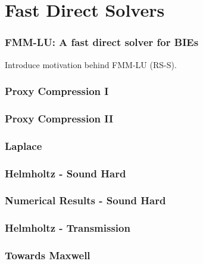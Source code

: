 \section{Fast Direct Solvers}

\begin{frame}
    \frametitle{FMM-LU: A fast direct solver for BIEs}
    Introduce motivation behind FMM-LU (RS-S).
\end{frame}


\begin{frame}
    \frametitle{Proxy Compression I}
\end{frame}

\begin{frame}

    \frametitle{Proxy Compression II}
    
\end{frame}


\begin{frame}

    \frametitle{Laplace}
    
\end{frame}

\begin{frame}

    \frametitle{Helmholtz - Sound Hard}
    
\end{frame}


\begin{frame}

    \frametitle{Numerical Results - Sound Hard}
    
\end{frame}

\begin{frame}

    \frametitle{Helmholtz - Transmission}
    
\end{frame}


\begin{frame}

    \frametitle{Towards Maxwell}
    
\end{frame}